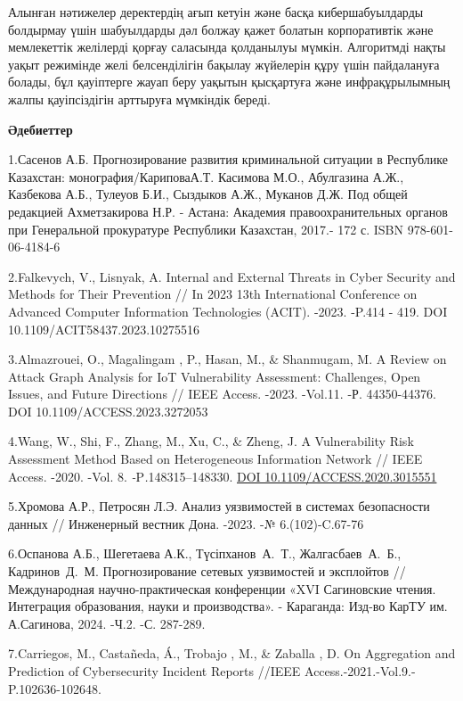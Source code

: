 Алынған нәтижелер деректердің ағып кетуін және басқа кибершабуылдарды
болдырмау үшін шабуылдарды дәл болжау қажет болатын корпоративтік және
мемлекеттік желілерді қорғау саласында қолданылуы мүмкін. Алгоритмді
нақты уақыт режимінде желі белсенділігін бақылау жүйелерін құру үшін
пайдалануға болады, бұл қауіптерге жауап беру уақытын қысқартуға және
инфрақұрылымның жалпы қауіпсіздігін арттыруға мүмкіндік береді.

{\bfseries Әдебиеттер}

1.Сасенов А.Б. Прогнозирование развития криминальной ситуации в
Республике Казахстан: монография/КариповаА.Т. Касимова М.О., Абулгазина
А.Ж., Казбекова А.Б., Тулеуов Б.И., Сыздыков А.Ж., Муканов Д.Ж. Под
общей редакцией Ахметзакирова Н.Р. - Астана: Академия правоохранительных
органов при Генеральной прокуратуре Республики Казахстан, 2017.- 172 с.
ISBN 978-601-06-4184-6

2.Falkevych, V., Lisnyak, A. Internal and External Threats in Cyber
Security and Methods for Their Prevention // In 2023 13th International
Conference on Advanced Computer Information Technologies (ACIT). -2023.
-P.414 - 419. DOI 10.1109/ACIT58437.2023.10275516

3.Almazrouei, O., Magalingam , P., Hasan, M., \& Shanmugam, M. A Review
on Attack Graph Analysis for IoT Vulnerability Assessment: Challenges,
Open Issues, and Future Directions // IEEE Access. -2023. -Vol.11. -Р.
44350-44376. DOI 10.1109/ACCESS.2023.3272053

4.Wang, W., Shi, F., Zhang, M., Xu, C., \& Zheng, J. A Vulnerability
Risk Assessment Method Based on Heterogeneous Information Network //
IEEE Access. -2020. -Vol. 8. \emph{-}P\emph{.}148315--148330.
\href{https://doi.org/10.1109/ACCESS.2020.3015551}{DOI
10.1109/ACCESS.2020.3015551}

5.Хромова А.Р., Петросян Л.Э. Анализ уязвимостей в системах безопасности
данных // Инженерный вестник Дона. -2023. -№ 6.(102)-C.67-76

6.Оспанова А.Б., Шегетаева А.К., Түсіпханов~А.~Т., Жалгасбаев~А.~Б.,
Кадринов~Д.~М. Прогнозирование сетевых уязвимостей и эксплойтов //
Международная научно-практическая конференции «XVI Сагиновские чтения.
Интеграция образования, науки и производства». - Караганда: Изд-во КарТУ
им. А.Сагинова, 2024. -Ч.2. -С. 287-289.

7.Carriegos, M., Castañeda, Á., Trobajo , M., \& Zaballa , D. On
Aggregation and Prediction of Cybersecurity Incident Reports //IEEE
Access.-2021.-Vol.9.-P.102636-102648.

